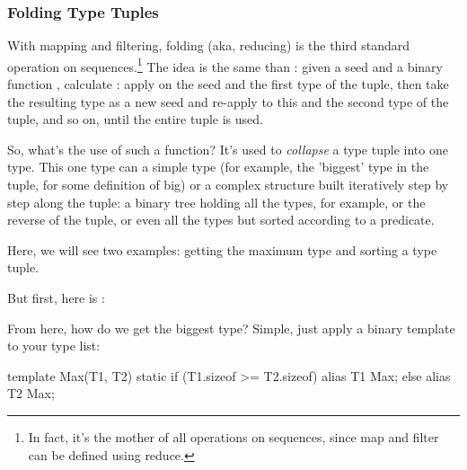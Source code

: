 
\subsubsection{Folding Type Tuples}\label{staticreduce}

With mapping and filtering, folding (aka, reducing) is the third standard operation on sequences.\footnote{ In fact, it's the mother of all operations on sequences, since map and filter can be defined using reduce.} The idea is the same than : given a seed  and a binary function , calculate : apply  on the seed and the first type of the tuple, then take the resulting type as a new seed and re-apply  to this and the second type of the tuple, and so on, until the entire tuple is used.

So, what's the use of such a function? It's used to \emph{collapse} a type tuple into one type. This one type can a simple type (for example, the 'biggest' type in the tuple, for some definition of big) or a complex structure built iteratively step by step along the tuple: a binary tree holding all the types, for example, or the reverse of the tuple, or even all the types but sorted according to a predicate.

Here, we will see two examples: getting the maximum type and sorting a type tuple.

But first, here is :


From here, how do we get the biggest type? Simple, just apply a  binary template to your type list:

\begin{dcode}
template Max(T1, T2)
{
    static if (T1.sizeof >= T2.sizeof)
        alias T1 Max;
    else
        alias T2 Max;
}
\end{dcode}

